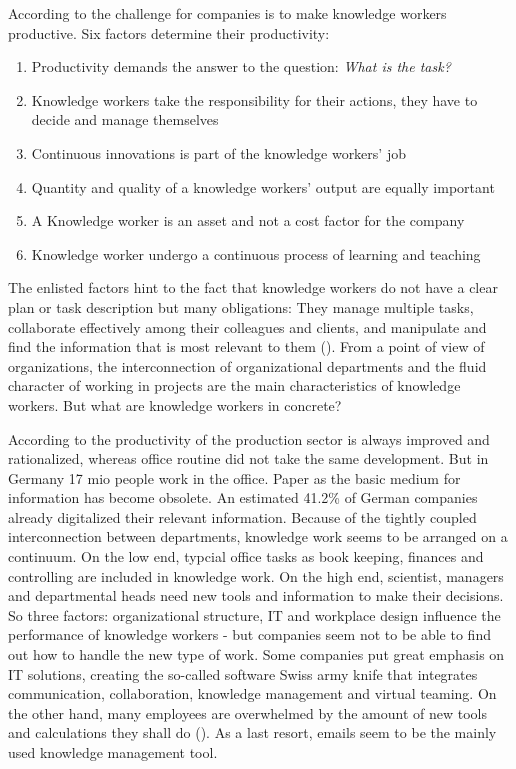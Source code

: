 According to \cite{drucker1999knowledge} the challenge for companies is to make knowledge workers productive. Six factors determine their productivity:
\begin{enumerate}
  \item Productivity demands the answer to the question: \textit{What is the task?}
  \item Knowledge workers take the responsibility for their actions, they have to decide and manage themselves
  \item Continuous innovations is part of the knowledge workers' job
  \item Quantity and quality of a knowledge workers' output are equally important
  \item A Knowledge worker is an asset and  not a cost factor for the company
  \item Knowledge worker undergo a continuous process of learning and teaching
\end{enumerate}


The enlisted factors hint to the fact that knowledge workers do not have a clear plan or task description but many obligations: They manage multiple tasks, collaborate effectively among their colleagues and clients, and manipulate and find the information that is most relevant to them (\cite{voida2002integrating}). From a point of view of organizations, the interconnection of organizational departments and the fluid character of working in projects are the main characteristics of knowledge workers. But what are knowledge workers in concrete? 

According to \cite{spaeth2009info} the productivity of the production sector is always improved and rationalized, whereas office routine did not take the same development. But in Germany 17 mio people work in the office. Paper as the basic medium for information has become obsolete. An estimated 41.2\% of German companies already digitalized their relevant information. Because of the tightly coupled interconnection between departments, knowledge work seems to be arranged on a continuum. On the low end, typcial office tasks as book keeping, finances and controlling are included in knowledge work. On the high end, scientist, managers and departmental heads need new tools and information to make their decisions. So three factors: organizational structure, IT and workplace design influence the performance of knowledge workers - but companies seem not to be able to find out how to handle the new type of work. Some companies put great emphasis on IT solutions, creating the so-called software Swiss army knife that integrates communication, collaboration, knowledge management and virtual teaming. On the other hand, many employees are overwhelmed by the amount of new tools and calculations they shall do (\cite{davenport2012mysterious}). As a last resort, emails seem to be the mainly used knowledge management tool. 

